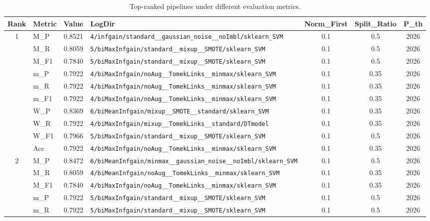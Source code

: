 \begin{table}[htbp]
\caption{Top-ranked pipelines under different evaluation metrics.}
\label{tab:rank_metric_vertical}
\centering
\small
\setlength{\tabcolsep}{4pt}
\begin{tabular}{|c|l|c|>{\ttfamily\footnotesize}p{7.2cm}|c|c|c|}
\hline
Rank & Metric & Value & LogDir & Norm\_First & Split\_Ratio & P\_th \\
\hline
\multirow{10}{*}{1} & M\_P & 0.8521 & \texttt{4/infgain/standard\_\_gaussian\_noise\_\_noImbl/sklearn\_SVM} & 0.1 & 0.5  & 2026 \\ 
 & M\_R & 0.8059 & \texttt{5/biMaxInfgain/standard\_\_mixup\_\_SMOTE/sklearn\_SVM} & 0.1 & 0.5  & 2026 \\ 
 & M\_F1 & 0.7840 & \texttt{5/biMaxInfgain/standard\_\_mixup\_\_SMOTE/sklearn\_SVM} & 0.1 & 0.5  & 2026 \\ 
 & m\_P & 0.7922 & \texttt{4/biMaxInfgain/noAug\_\_TomekLinks\_\_minmax/sklearn\_SVM} & 0.1 & 0.35  & 2026 \\ 
 & m\_R & 0.7922 & \texttt{4/biMaxInfgain/noAug\_\_TomekLinks\_\_minmax/sklearn\_SVM} & 0.1 & 0.35  & 2026 \\ 
 & m\_F1 & 0.7922 & \texttt{4/biMaxInfgain/noAug\_\_TomekLinks\_\_minmax/sklearn\_SVM} & 0.1 & 0.35  & 2026 \\ 
 & W\_P & 0.8369 & \texttt{6/biMeanInfgain/mixup\_\_SMOTE\_\_standard/sklearn\_SVM} & 0.1 & 0.35  & 2026 \\ 
 & W\_R & 0.7922 & \texttt{4/biMaxInfgain/mixup\_\_TomekLinks\_\_standard/DTmodel} & 0.1 & 0.35  & 2026 \\ 
 & W\_F1 & 0.7966 & \texttt{5/biMaxInfgain/standard\_\_mixup\_\_SMOTE/sklearn\_SVM} & 0.1 & 0.5  & 2026 \\ 
 & Acc & 0.7922 & \texttt{4/biMaxInfgain/noAug\_\_TomekLinks\_\_minmax/sklearn\_SVM} & 0.1 & 0.35  & 2026 \\ 
\hline
\multirow{10}{*}{2} & M\_P & 0.8472 & \texttt{6/biMeanInfgain/minmax\_\_gaussian\_noise\_\_noImbl/sklearn\_SVM} & 0.1 & 0.5  & 2026 \\ 
 & M\_R & 0.8059 & \texttt{4/biMeanInfgain/noAug\_\_TomekLinks\_\_minmax/sklearn\_SVM} & 0.1 & 0.35  & 2026 \\ 
 & M\_F1 & 0.7840 & \texttt{4/biMaxInfgain/noAug\_\_TomekLinks\_\_minmax/sklearn\_SVM} & 0.1 & 0.35  & 2026 \\ 
 & m\_P & 0.7922 & \texttt{5/biMaxInfgain/standard\_\_mixup\_\_SMOTE/sklearn\_SVM} & 0.1 & 0.5  & 2026 \\ 
 & m\_R & 0.7922 & \texttt{5/biMaxInfgain/standard\_\_mixup\_\_SMOTE/sklearn\_SVM} & 0.1 & 0.5  & 2026 \\ 

\end{tabular}
\end{table}
